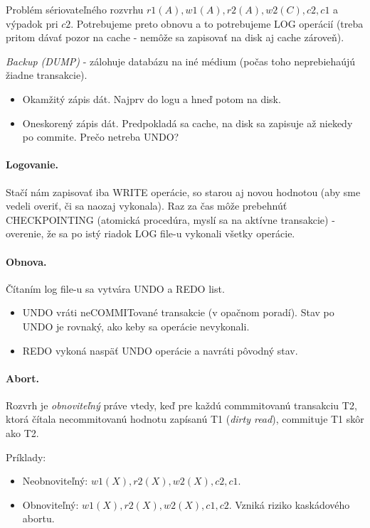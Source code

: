 \documentclass[10pt,a4paper]{article}
\begin{document}
Problém sériovateľného rozvrhu $r1(A), w1(A), r2(A), w2(C), c2, c1$ a výpadok pri $c2$.
Potrebujeme preto obnovu a to potrebujeme LOG operácií (treba pritom dávať pozor na cache - nemôže sa zapisovať na disk aj cache zároveň). 

\emph{Backup (DUMP)} - zálohuje databázu na iné médium (počas toho neprebiehaújú žiadne transakcie). 

\begin{itemize}
\item Okamžitý zápis dát. Najprv do logu a hneď potom na disk. 
\item Oneskorený zápis dát. Predpokladá sa cache, na disk sa zapisuje až niekedy po commite. Prečo netreba UNDO?
\end{itemize}

\paragraph{Logovanie.}
Stačí nám zapisovať iba WRITE operácie, so starou aj novou hodnotou (aby sme vedeli overiť, či sa naozaj vykonala).
Raz za čas môže prebehnúť CHECKPOINTING (atomická procedúra, myslí sa na aktívne transakcie) - overenie, že sa po istý riadok LOG file-u vykonali všetky operácie.  

\paragraph{Obnova.}
Čítaním log file-u sa vytvára UNDO a REDO list.

\begin{itemize}
\item UNDO vráti neCOMMITované transakcie (v opačnom poradí). Stav po UNDO je rovnaký, ako keby sa operácie nevykonali.  
\item REDO vykoná naspäť UNDO operácie a navráti pôvodný stav. 
\end{itemize}

\paragraph{Abort.}
Rozvrh je \emph{obnoviteľný} práve vtedy, keď pre každú commmitovanú transakciu T2, ktorá čítala necommitovanú hodnotu zapísanú T1 (\emph{dirty read}), commituje T1 skôr ako T2. 

Príklady: 
\begin{itemize}
\item Neobnoviteľný: $w1(X), r2(X), w2(X), c2, c1$.  
\item Obnoviteľný: $w1(X), r2(X), w2(X), c1, c2$. Vzniká riziko kaskádového abortu. 
\end{itemize}
\end{document}
